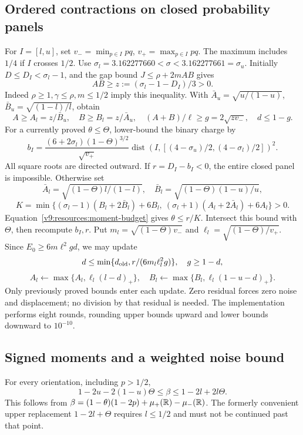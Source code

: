 \subsection{Ordered contractions on closed probability panels}\label{v9:resources:iteration}
For $I=[l,u]$, set \(v_-=\min_{p\in I}pq\), \(v_+=\max_{p\in I}pq\).
The maximum includes \(1/4\) if \(I\) crosses \(1/2\).
Use \(\sigma_l=3.162277660<\sigma<3.162277661=\sigma_u\).
Initially \(D\le D_I<\sigma_l-1\), and the gap bound
\(J\le\rho+2mAB\) gives
\[
 AB\ge z:=(\sigma_l-1-D_I)/3>0.
\]
Indeed \(\rho\ge1,\gamma\le\rho,m\le1/2\) imply this inequality.
With \(\bar A_u=\sqrt{u/(1-u)}\), \(\bar B_u=\sqrt{(1-l)/l}\), obtain
\[
 A\ge A_l=z/\bar B_u,\quad B\ge B_l=z/\bar A_u,\quad
 (A+B)/\ell\ge g=2\sqrt{zv_-},\quad d\le1-g.
\]
For a currently proved \(\theta\le\Theta\), lower-bound the binary charge by
\[
 b_I=\frac{(6+2\sigma_l)(1-\Theta)^{3/2}}{\sqrt{v_+}}
        \operatorname{dist}(I,[ (4-\sigma_u)/2,(4-\sigma_l)/2])^2.
\]
All square roots are directed outward. If \(r=D_I-b_I<0\), the entire
closed panel is impossible. Otherwise set
\[
 \bar A_l=\sqrt{(1-\Theta)l/(1-l)},\quad
 \bar B_l=\sqrt{(1-\Theta)(1-u)/u},
\]
\[
 K=\min\{(\sigma_l-1)(B_l+2\bar B_l)+6B_l,\
          (\sigma_l+1)(A_l+2\bar A_l)+6A_l\}>0.
\]
Equation~\eqref{v9:resources:moment-budget} gives \(\theta\le r/K\).
Intersect this bound with \(\Theta\), then recompute \(b_I,r\).
Put \(m_l=\sqrt{(1-\Theta)v_-}\) and
\(\ell_l=\sqrt{(1-\Theta)/v_+}\). Since
\(E_0\ge6m\ell^2gd\), we may update
\[
 d\le\min\{d_{\rm old},r/(6m_l\ell_l^2g)\},\quad
 g\ge1-d,
\]
\[
 A_l\gets\max\{A_l,\ell_l(l-d)_+\},\quad
 B_l\gets\max\{B_l,\ell_l(1-u-d)_+\}.
\]
Only previously proved bounds enter each update. Zero residual forces
zero noise and displacement; no division by that residual is needed.
The implementation performs eight rounds, rounding upper bounds upward and
lower bounds downward to \(10^{-10}\).

\subsection{Signed moments and a weighted noise bound}\label{v9:resources:exports}
For every orientation, including \(p>1/2\),
\begin{equation}\label{v9:resources:beta}
 1-2u-2(1-u)\Theta\le\beta\le1-2l+2l\Theta.
\end{equation}
This follows from
\(\beta=(1-\theta)(1-2p)+\mu_+(\mathbb R)-\mu_-(\mathbb R)\).
The formerly convenient upper replacement \(1-2l+\Theta\) requires
\(l\le1/2\) and must not be continued past that point.


